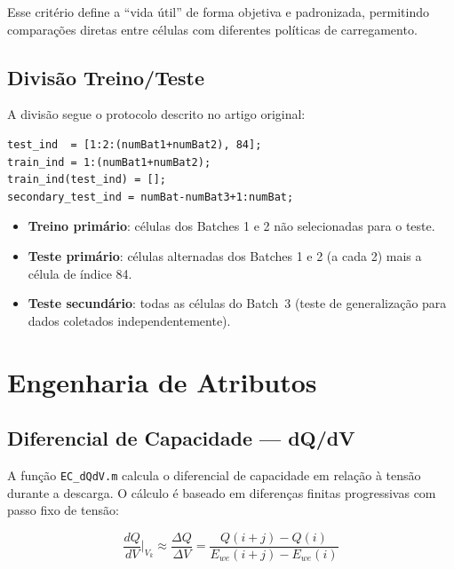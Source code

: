 \documentclass[12pt,a4paper]{article}
\begin{document}
Esse crit\'{e}rio define a ``vida \'{u}til'' de forma objetiva e padronizada, permitindo
compara\c{c}\~oes diretas entre c\'{e}lulas com diferentes pol\'{i}ticas de carregamento.

\subsection{Divis\~ao Treino/Teste}

A divis\~ao segue o protocolo descrito no artigo original:

\begin{lstlisting}[style=matlab, caption={Divis\~ao treino/teste}]
test_ind  = [1:2:(numBat1+numBat2), 84];
train_ind = 1:(numBat1+numBat2);
train_ind(test_ind) = [];
secondary_test_ind = numBat-numBat3+1:numBat;
\end{lstlisting}

\begin{itemize}
  \item \textbf{Treino prim\'{a}rio}: c\'{e}lulas dos Batches 1 e 2 n\~ao selecionadas para
    o teste.
  \item \textbf{Teste prim\'{a}rio}: c\'{e}lulas alternadas dos Batches 1 e 2 (a cada 2)
    mais a c\'{e}lula de \'{i}ndice 84.
  \item \textbf{Teste secund\'{a}rio}: todas as c\'{e}lulas do Batch~3 (teste de
    generaliza\c{c}\~ao para dados coletados independentemente).
\end{itemize}

\section{Engenharia de Atributos}

\subsection{Diferencial de Capacidade --- dQ/dV}

A fun\c{c}\~ao \texttt{EC\_dQdV.m} calcula o diferencial de capacidade em rela\c{c}\~ao \`{a}
tens\~ao durante a descarga. O c\'{a}lculo \'{e} baseado em diferen\c{c}as finitas progressivas
com passo fixo de tens\~ao:

\begin{equation}
\frac{dQ}{dV}\bigg|_{V_k} \approx \frac{\Delta Q}{\Delta V} =
\frac{Q(i+j) - Q(i)}{E_{we}(i+j) - E_{we}(i)}
\end{equation}
\end{document}
